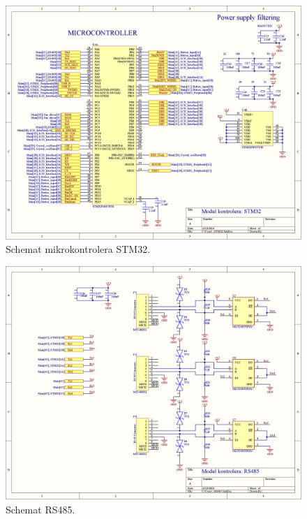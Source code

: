 \begin{figure}
    \begin{center}
        \includegraphics[width = 21cm]{zalaczniki/kontroler/Kontroler_Strona_08.jpg}
        \caption{Schemat mikrokontrolera STM32.}
    \end{center}
\end{figure}

\begin{figure}
    \begin{center}
        \includegraphics[width = 21cm]{zalaczniki/kontroler/Kontroler_Strona_09.jpg}
        \caption{Schemat RS485.}
    \end{center}
\end{figure}


